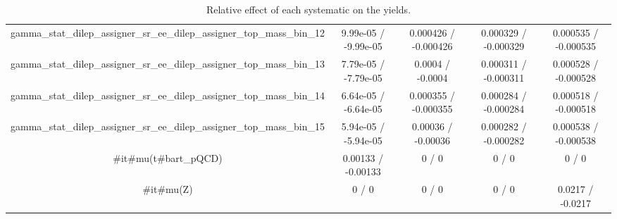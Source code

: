 \documentclass[10pt]{article}
\begin{document}
\begin{table}[htbp]
\begin{center}
\begin{tabular}{|c|c|c|c|c|}
  gamma_stat_dilep_assigner_sr_ee_dilep_assigner_top_mass_bin_12 & 9.99e-05 / -9.99e-05 & 0.000426 / -0.000426 & 0.000329 / -0.000329 & 0.000535 / -0.000535 \\ 
  gamma_stat_dilep_assigner_sr_ee_dilep_assigner_top_mass_bin_13 & 7.79e-05 / -7.79e-05 & 0.0004 / -0.0004 & 0.000311 / -0.000311 & 0.000528 / -0.000528 \\ 
  gamma_stat_dilep_assigner_sr_ee_dilep_assigner_top_mass_bin_14 & 6.64e-05 / -6.64e-05 & 0.000355 / -0.000355 & 0.000284 / -0.000284 & 0.000518 / -0.000518 \\ 
  gamma_stat_dilep_assigner_sr_ee_dilep_assigner_top_mass_bin_15 & 5.94e-05 / -5.94e-05 & 0.00036 / -0.00036 & 0.000282 / -0.000282 & 0.000538 / -0.000538 \\ 
  #it{#mu}(t#bar{t}_{pQCD}) & 0.00133 / -0.00133 & 0 / 0 & 0 / 0 & 0 / 0 \\ 
  #it{#mu}(Z) & 0 / 0 & 0 / 0 & 0 / 0 & 0.0217 / -0.0217 \\ 
\hline 
\end{tabular} 
\caption{Relative effect of each systematic on the yields.} 
\end{center} 
\end{table} 
\end{document}
